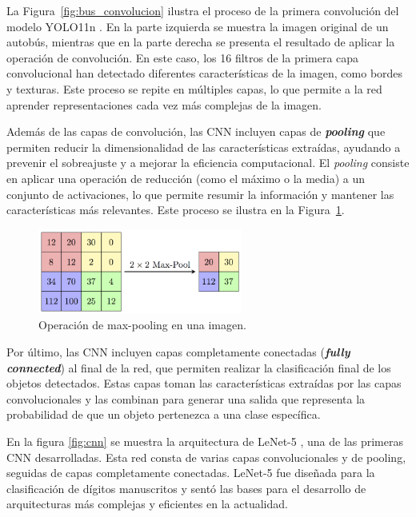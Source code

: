 \documentclass[11pt,spanish,listoffigures,listoftables]{tfgetsinf}
\begin{document}
La Figura~\ref{fig:bus_convolucion} ilustra el proceso de la primera convolución del modelo YOLO11n \cite{yolo11_ultralytics}. En la parte izquierda se muestra la imagen original de un autobús, mientras que en la parte derecha se presenta el resultado de aplicar la operación de convolución. En este caso, los 16 filtros de la primera capa convolucional han detectado diferentes características de la imagen, como bordes y texturas. Este proceso se repite en múltiples capas, lo que permite a la red aprender representaciones cada vez más complejas de la imagen.

Además de las capas de convolución, las CNN incluyen capas de \textit{\textbf{pooling}} que permiten reducir la dimensionalidad de las características extraídas, ayudando a prevenir el sobreajuste y a mejorar la eficiencia computacional. El \textit{pooling} consiste en aplicar una operación de reducción (como el máximo o la media) a un conjunto de activaciones, lo que permite resumir la información y mantener las características más relevantes. Este proceso se ilustra en la Figura~\ref{fig:pooling}.

\begin{figure}[H]
   \centering
   \includegraphics[width=0.6\textwidth]{images/estado_del_arte/max_pooling.png}
   \caption{Operación de max-pooling en una imagen.}
   \label{fig:pooling}
\end{figure}

Por último, las CNN incluyen capas completamente conectadas (\textit{\textbf{fully connected}}) al final de la red, que permiten realizar la clasificación final de los objetos detectados. Estas capas toman las características extraídas por las capas convolucionales y las combinan para generar una salida que representa la probabilidad de que un objeto pertenezca a una clase específica.

En la figura \ref{fig:cnn} se muestra la arquitectura de LeNet-5 \cite{lecun1998gradient}, una de las primeras CNN desarrolladas. Esta red consta de varias capas convolucionales y de pooling, seguidas de capas completamente conectadas. LeNet-5 fue diseñada para la clasificación de dígitos manuscritos y sentó las bases para el desarrollo de arquitecturas más complejas y eficientes en la actualidad.
\end{document}
